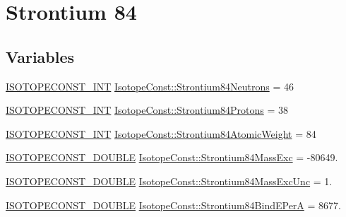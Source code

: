 \hypertarget{group___isotope_const-_strontium-_sr84}{}\section{Strontium 84}
\label{group___isotope_const-_strontium-_sr84}
\subsection*{Variables}
\begin{DoxyCompactItemize}
\item 
\mbox{\hyperlink{group___isotope_const-_macros_ga5f18360b3e99483a35c32d789e62621c}{I\+S\+O\+T\+O\+P\+E\+C\+O\+N\+S\+T\+\_\+\+I\+NT}} \mbox{\hyperlink{group___isotope_const-_strontium-_sr84_gaf126d1c5b8a812a014f739f09cc10f59}{Isotope\+Const\+::\+Strontium84\+Neutrons}} = 46
\item 
\mbox{\hyperlink{group___isotope_const-_macros_ga5f18360b3e99483a35c32d789e62621c}{I\+S\+O\+T\+O\+P\+E\+C\+O\+N\+S\+T\+\_\+\+I\+NT}} \mbox{\hyperlink{group___isotope_const-_strontium-_sr84_ga8e5b70f75b046ea5b5183939821d99d2}{Isotope\+Const\+::\+Strontium84\+Protons}} = 38
\item 
\mbox{\hyperlink{group___isotope_const-_macros_ga5f18360b3e99483a35c32d789e62621c}{I\+S\+O\+T\+O\+P\+E\+C\+O\+N\+S\+T\+\_\+\+I\+NT}} \mbox{\hyperlink{group___isotope_const-_strontium-_sr84_ga21d207af6e43f014e08141eede004f0c}{Isotope\+Const\+::\+Strontium84\+Atomic\+Weight}} = 84
\item 
\mbox{\hyperlink{group___isotope_const-_macros_ga8f45a7272ce02c0b4c65c44636ed719a}{I\+S\+O\+T\+O\+P\+E\+C\+O\+N\+S\+T\+\_\+\+D\+O\+U\+B\+LE}} \mbox{\hyperlink{group___isotope_const-_strontium-_sr84_ga4ac61ea655e15ea31c2c7bcb04f6d2d4}{Isotope\+Const\+::\+Strontium84\+Mass\+Exc}} = -\/80649.
\item 
\mbox{\hyperlink{group___isotope_const-_macros_ga8f45a7272ce02c0b4c65c44636ed719a}{I\+S\+O\+T\+O\+P\+E\+C\+O\+N\+S\+T\+\_\+\+D\+O\+U\+B\+LE}} \mbox{\hyperlink{group___isotope_const-_strontium-_sr84_ga99168739a88a7e507a64881b36a3b2a9}{Isotope\+Const\+::\+Strontium84\+Mass\+Exc\+Unc}} = 1.
\item 
\mbox{\hyperlink{group___isotope_const-_macros_ga8f45a7272ce02c0b4c65c44636ed719a}{I\+S\+O\+T\+O\+P\+E\+C\+O\+N\+S\+T\+\_\+\+D\+O\+U\+B\+LE}} \mbox{\hyperlink{group___isotope_const-_strontium-_sr84_gadfbbb3d8a6a4c2668406c878203c1243}{Isotope\+Const\+::\+Strontium84\+Bind\+E\+PerA}} = 8677.
\item 

\end{DoxyCompactItemize}
